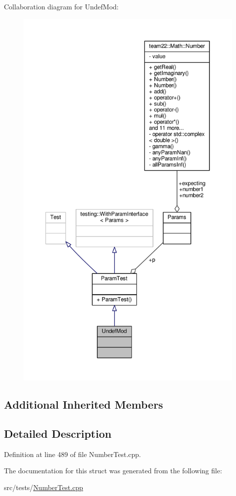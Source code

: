 Collaboration diagram for Undef\+Mod\+:
\nopagebreak
\begin{figure}[H]
\begin{center}
\leavevmode
\includegraphics[height=550pt]{struct_undef_mod__coll__graph}
\end{center}
\end{figure}
\subsection*{Additional Inherited Members}


\subsection{Detailed Description}


Definition at line 489 of file Number\+Test.\+cpp.



The documentation for this struct was generated from the following file\+:\begin{DoxyCompactItemize}
\item 
src/tests/\hyperlink{_number_test_8cpp}{Number\+Test.\+cpp}\end{DoxyCompactItemize}
